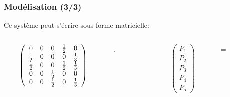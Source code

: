 \documentclass{beamer}
\begin{document}
\begin{frame}
  \frametitle{Modélisation (3/3)}
  
  Ce système peut s'écrire sous forme matricielle:\\
  \begin{columns}

    \begin{column}[l]{0.3\linewidth}
      \begin{minipage}{0.3\linewidth}
        \[ \left(
          \begin{array}{ c c c c c}
            0           & 0 & 0           & \frac{1}{2} & 0           \\
            \frac{1}{2} & 0 & 0           & 0           & \frac{1}{3} \\
            \frac{1}{2} & 0 & 0           & \frac{1}{2} & \frac{1}{3} \\
            0           & 0 & \frac{1}{2} & 0           & 0           \\
            0           & 0 & \frac{1}{2} & 0           & \frac{1}{3}
          \end{array} \right)
        \]
      \end{minipage}
    \end{column}

    \begin{column}[r]{0.0001\linewidth}
      \begin{minipage}{0.0001\linewidth}
        .
      \end{minipage}
    \end{column}

    
    \begin{column}[c]{0.05\linewidth}
      \begin{minipage}{0.05\linewidth}
        \[ \left(
          \begin{array}{ c }
            P_1 \\
            P_2 \\
            P_3 \\
            P_4 \\
            P_5
          \end{array} \right)
        \]
      \end{minipage}
    \end{column}

    \begin{column}[r]{0.01\linewidth}
      \begin{minipage}{0.01\linewidth}
          =
      \end{minipage}
    \end{column}


\end{columns}
\end{frame}
\end{document}
